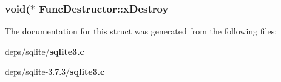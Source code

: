 \subsubsection{\setlength{\rightskip}{0pt plus 5cm}void($\ast$ \bf{Func\-Destructor::x\-Destroy}}\label{structFuncDestructor_5b831bba34ed7108d53661d550b3fc4e}




The documentation for this struct was generated from the following files:\begin{CompactItemize}
\item 
deps/sqlite/\bf{sqlite3.c}\item 
deps/sqlite-3.7.3/\bf{sqlite3.c}\end{CompactItemize}
